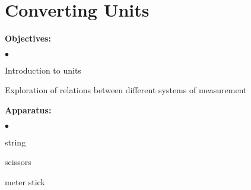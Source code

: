 
\section{Converting Units}

\makelabheader %

{\noindent \bf Objectives:} \begin{list}{$\bullet$}{\itemsep0pt }

\item Introduction to units \item Exploration of relations between different systems of measurement

\end{list}

{\noindent \bf Apparatus:} \begin{list}{$\bullet$}{\itemsep0pt }

\item string \item scissors \item meter stick

\end{list}


